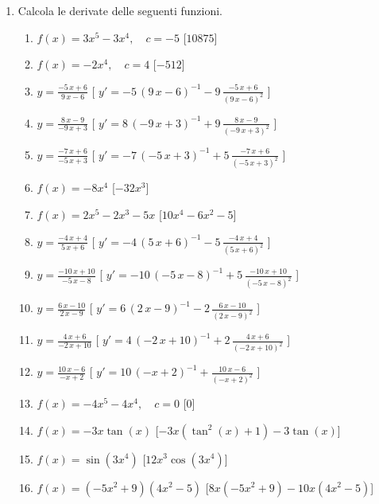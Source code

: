 \begin{enumerate}
\item Calcola le derivate delle seguenti funzioni.
\begin{enumerate}
\item \(f(x)= 3 x^{5} - 3 x^{4},\quad c=-5\) \hfill [\(10875\)]
\item \(f(x)= - 2 x^{4},\quad c=4\) \hfill [\(-512\)]
\item \(y= {\frac {-5\,x+6}{9\,x-6}} \) \hfill [ \(y'= -5\, \left( 9\,x-6 \right) 
^{-1}-9\,{\frac {-5\,x+6}{ \left( 9\,x-6 \right) ^{2}}}\) ]
\item \(y= {\frac {8\,x-9}{-9\,x+3}} \) \hfill [ \(y'= 8\, \left( -9\,x+3 \right) 
^{-1}+9\,{\frac {8\,x-9}{ \left( -9\,x+3 \right) ^{2}}}\) ]
\item \(y= {\frac {-7\,x+6}{-5\,x+3}} \) \hfill [ \(y'= -7\, \left( -5\,x+3 \right) 
^{-1}+5\,{\frac {-7\,x+6}{ \left( -5\,x+3 \right) ^{2}}}\) ]
\item \(f(x) = - 8 x^{4}\) \hfill [\(- 32 x^{3}\)]
\item \(f(x) = 2 x^{5} - 2 x^{3} - 5 x\) \hfill [\(10 x^{4} - 6 x^{2} - 5\)]
\item \(y= {\frac {-4\,x+4}{5\,x+6}} \) \hfill [ \(y'= -4\, \left( 5\,x+6 \right) 
^{-1}-5\,{\frac {-4\,x+4}{ \left( 5\,x+6 \right) ^{2}}}\) ]
\item \(y= {\frac {-10\,x+10}{-5\,x-8}} \) \hfill [ \(y'= -10\, \left( -5\,x-8 
\right) ^{-1}+5\,{\frac {-10\,x+10}{ \left( -5\,x-8 \right) ^{2}}}\) ]
\item \(y= {\frac {6\,x-10}{2\,x-9}} \) \hfill [ \(y'= 6\, \left( 2\,x-9 \right) 
^{-1}-2\,{\frac {6\,x-10}{ \left( 2\,x-9 \right) ^{2}}}\) ]
\item \(y= {\frac {4\,x+6}{-2\,x+10}} \) \hfill [ \(y'= 4\, \left( -2\,x+10 \right) 
^{-1}+2\,{\frac {4\,x+6}{ \left( -2\,x+10 \right) ^{2}}}\) ]
\item \(y= {\frac {10\,x-6}{-x+2}} \) \hfill [ \(y'= 10\, \left( -x+2 \right) 
^{-1}+{\frac {10\,x-6}{ \left( -x+2 \right) ^{2}}}\) ]
\item \(f(x)= - 4 x^{5} - 4 x^{4},\quad c=0\) \hfill [\(0\)]
\item \(f(x) = - 3 x \tan{\left (x \right )}\) \hfill [\(- 3 x 
\left(\tan^{2}{\left (x \right )} + 1\right) - 3 \tan{\left (x \right )}\)]
\item \(f(x) = \sin{\left (3 x^{4} \right )}\) \hfill [\(12 x^{3} \cos{\left (3 
x^{4} \right )}\)]
\item \(f(x) = \left(- 5 x^{2} + 9\right) \left(4 x^{2} - 5\right)\) \hfill [\(8 
x \left(- 5 x^{2} + 9\right) - 10 x \left(4 x^{2} - 5\right)\)]

\end{enumerate}
\end{enumerate}
